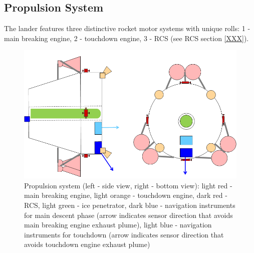 \subsection{Propulsion System}
The lander features three distinctive rocket motor systems with unique rolls: 1 - main breaking engine, 2 - touchdown engine, 3 - RCS (see RCS section \ref{XXX}).

\begin{figure}[htb]
	\centering
	\includegraphics[width=\textwidth]{Lander/aaronlanderprop}
	\caption{Propulsion system (left - side view, right - bottom view): light red - main breaking engine, light orange - touchdown engine, dark red - RCS, light green - ice penetrator, dark blue - navigation instruments for main descent phase (arrow indicates sensor direction that avoids main breaking engine exhaust plume), light blue - navigation instruments for touchdown (arrow indicates sensor direction that avoids touchdown engine exhaust plume)\label{fig:alanderprop}}
\end{figure}

